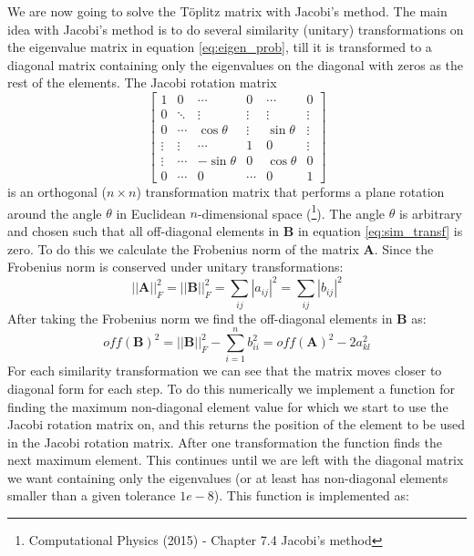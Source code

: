 \documentclass[12pt,a4paper,english]{article}
\begin{document}
We are now going to solve the Töplitz matrix with Jacobi's method. The main idea with Jacobi's method is to do several similarity (unitary) transformations on the eigenvalue matrix in equation \ref{eq:eigen_prob}, till it is transformed to a diagonal matrix containing only the eigenvalues on the diagonal with zeros as the rest of the elements. The Jacobi rotation matrix 
\begin{equation}
\label{eq:jacobi_rotate}
\begin{bmatrix}
1 & 0 & \cdots & 0 & \cdots & 0\\
0 & \ddots & \vdots &\vdots & \vdots & \vdots\\
0 & \cdots & \cos\theta & \vdots & \sin\theta & \vdots\\
\vdots & \vdots & \cdots & 1 & 0 & \vdots\\
\vdots & \cdots & -\sin\theta & 0 & \cos\theta & 0 \\
0 & \cdots & 0 & \cdots & 0 & 1
\end{bmatrix}
\end{equation}
is an orthogonal ($n\times n$) transformation matrix that performs a plane rotation around the angle $\theta$ in Euclidean $n$-dimensional space (\citet{lectures}\footnote{Computational Physics (2015) - Chapter 7.4 Jacobi's method}). The angle $\theta$ is arbitrary and chosen such that all off-diagonal elements in \textbf{B} in equation \ref{eq:sim_transf} is zero. To do this we calculate the Frobenius norm of the matrix \textbf{A}. Since the Frobenius norm is conserved under unitary transformations:
\begin{equation}
\label{eq:Frobenius}
||\textbf{A}||_F^2 = ||\textbf{B}||_F^2=\sum_{ij}|a_{ij}|^2=\sum_{ij}|b_{ij}|^2
\end{equation}
After taking the Frobenius norm we find the off-diagonal elements in \textbf{B} as:
\begin{equation}
\label{eq:off_diag}
off(\textbf{B})^2=||\textbf{B}||_F^2-\sum_{i=1}^{n}b_{ii}^2=off(\textbf{A})^2-2a_{kl}^2
\end{equation}
For each similarity transformation we can see that the matrix moves closer to diagonal form for each step. To do this numerically we implement a function for finding the maximum non-diagonal element value for which we start to use the Jacobi rotation matrix on, and this returns the position of the element to be used in the Jacobi rotation matrix. After one transformation the function finds the next maximum element. This continues until we are left with the diagonal matrix we want containing only the eigenvalues (or at least has non-diagonal elements smaller than a given tolerance $1e-8$). This function is implemented as:
\end{document}
